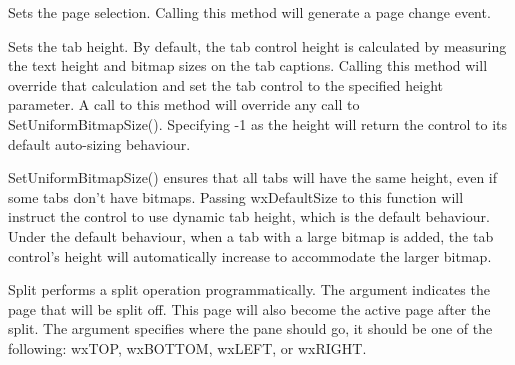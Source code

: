 
Sets the page selection.  Calling this method will generate a page change event.

\label{wxauinotebooksettabctrlheight}


Sets the tab height.  By default, the tab control height is calculated
by measuring the text height and bitmap sizes on the tab captions.  Calling this
method will override that calculation and set the tab control to the specified
height parameter.  A call to this method will override any call to SetUniformBitmapSize().
Specifying -1 as the height will return the control to its default auto-sizing behaviour.

\label{wxauinotebooksetuniformbitmapsize}


SetUniformBitmapSize() ensures that all tabs will have the same height, even
if some tabs don't have bitmaps.  Passing wxDefaultSize to this function will
instruct the control to use dynamic tab height, which is the default behaviour.
Under the default behaviour, when a tab with a large bitmap is added, the tab control's
height will automatically increase to accommodate the larger bitmap.


Split performs a split operation programmatically. The argument  indicates
the page that will be split off.  This page will also become the active page after the
split.  The  argument specifies where the pane should go, it should be one
of the following: wxTOP, wxBOTTOM, wxLEFT, or wxRIGHT.





